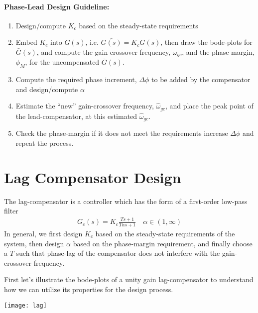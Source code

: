 \documentclass[twoside]{article}
\begin{document}
\paragraph{Phase-Lead Design Guideline:} 
\begin{enumerate}
	\item Design/compute $K_c$ based on the steady-state requirements 
	\item Embed $K_c$ into $G(s)$, i.e. $ \bar{G(s)} = K_c G(s)$, then 
	draw the bode-plots for $\bar{G}(s)$, and compute the gain-crossover
	frequency, $\omega_{gc}$, and the phase margin, $\phi_M$, for the
	uncompensated $\bar{G}(s)$. 
	\item Compute the required phase increment, $\Delta \phi$ to be
	added by the compensator and design/compute $\alpha$
	\item Estimate the ``new'' gain-crossover frequency, 
	$\hat{\omega}_{gc}$, and place the peak point of the lead-compensator,
	at this estimated $\hat{\omega}_{gc}$. 
	\item Check the phase-margin if it does not meet the requirements
	increase $\Delta \phi$ and repeat the process. 
\end{enumerate}

\newpage

\section{Lag Compensator Design}

The lag-compensator is a controller which has the form of a
first-order low-pass filter 
%
\begin{align*}
  G_{c}(s) = K_{c} \frac{T s + 1}{T \alpha s + 1}
  \quad \alpha \in (1,\infty)
\end{align*}
%
In general, we first design $K_{c}$ based on the steady-state
requirements of the system, then design $\alpha$
based on the phase-margin requirement, and finally 
choose a $T$ such that phase-lag of the compensator
does not interfere with the gain-crossover frequency.

First let's illustrate the bode-plots of a unity gain lag-compensator
to understand how we can utilize its properties for the 
design process. 

     \begin{center}
 \begin{minipage}[h]{\linewidth}
     \begin{center}
       \texttt{[image: lag]}
     \end{center}
 \end{minipage}
     \end{center}
\end{document}
